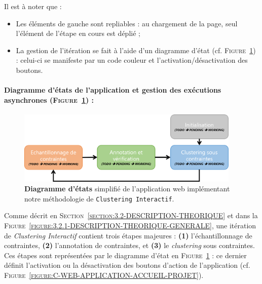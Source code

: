 			Il est à noter que :
			\begin{itemize}
				\item Les éléments de gauche sont repliables : au chargement de la page, seul l'élément de l'étape en cours est déplié ;
				\item La gestion de l'itération se fait à l'aide d'un diagramme d'état (cf. \textsc{Figure~\ref{figure:C-WEB-APPLICATION-DIAGRAMME-ETATS}}) : celui-ci se manifeste par un code couleur et l'activation/désactivation des boutons.
			\end{itemize}
		
		
		\paragraph{Diagramme d'états de l'application et gestion des exécutions asynchrones (\textsc{Figure~\ref{figure:C-WEB-APPLICATION-DIAGRAMME-ETATS}}) :}
			
			\begin{figure}[H]
				\centering
				\includegraphics[width=0.95\textwidth]{figures/interactive-clustering-application-diagramme-etats}
				\caption{
					\textbf{Diagramme d'états} simplifié de l'application web implémentant notre méthodologie de \texttt{Clustering Interactif}.
				}
				\label{figure:C-WEB-APPLICATION-DIAGRAMME-ETATS}
			\end{figure}
			
			Comme décrit en \textsc{Section~\ref{section:3.2-DESCRIPTION-THEORIQUE}} et dans la \textsc{Figure~\ref{figure:3.2.1-DESCRIPTION-THEORIQUE-GENERALE}}, une itération de \textit{Clustering Interactif} contient trois étapes majeures : \textbf{(1)} l'échantillonnage de contraintes, \textbf{(2)} l'annotation de contraintes, et \textbf{(3)} le \textit{clustering} sous contraintes.
			Ces étapes sont représentées par le diagramme d'état en \textsc{Figure~\ref{figure:C-WEB-APPLICATION-DIAGRAMME-ETATS}} : ce dernier définit l'activation ou la désactivation des boutons d'action de l'application (cf. \textsc{Figure~\ref{figure:C-WEB-APPLICATION-ACCUEIL-PROJET}}).
			
